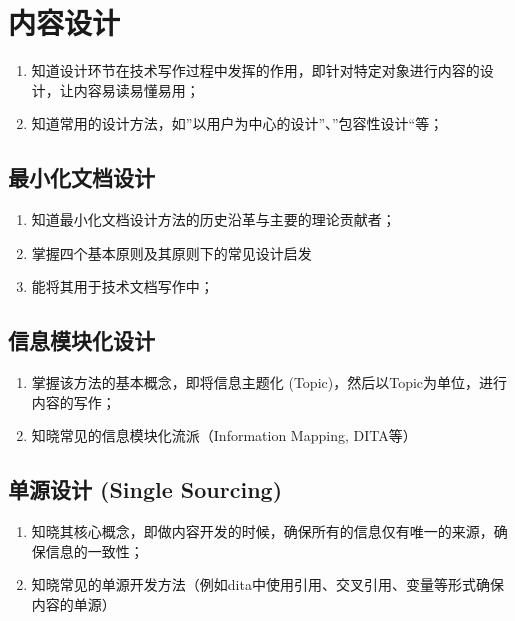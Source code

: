 \documentclass[letterpaper,10pt,english]{sphinxmanual}
\begin{document}
\section{内容设计}
\label{\detokenize{about/tw-comp-model:id6}}\begin{enumerate}
%
\item {} 
\sphinxAtStartPar
知道设计环节在技术写作过程中发挥的作用，即针对特定对象进行内容的设计，让内容易读易懂易用；

\item {} 
\sphinxAtStartPar
知道常用的设计方法，如”以用户为中心的设计”、”包容性设计“等；

\end{enumerate}


\subsection{最小化文档设计}
\label{\detokenize{about/tw-comp-model:id7}}\begin{enumerate}
%
\item {} 
\sphinxAtStartPar
知道最小化文档设计方法的历史沿革与主要的理论贡献者；

\item {} 
\sphinxAtStartPar
掌握四个基本原则及其原则下的常见设计启发

\item {} 
\sphinxAtStartPar
能将其用于技术文档写作中；

\end{enumerate}


\subsection{信息模块化设计}
\label{\detokenize{about/tw-comp-model:id8}}\begin{enumerate}
%
\item {} 
\sphinxAtStartPar
掌握该方法的基本概念，即将信息主题化 (Topic)，然后以Topic为单位，进行内容的写作；

\item {} 
\sphinxAtStartPar
知晓常见的信息模块化流派（Information Mapping, DITA等）

\end{enumerate}


\subsection{单源设计 (Single Sourcing)}
\label{\detokenize{about/tw-comp-model:single-sourcing}}\begin{enumerate}
%
\item {} 
\sphinxAtStartPar
知晓其核心概念，即做内容开发的时候，确保所有的信息仅有唯一的来源，确保信息的一致性；

\item {} 
\sphinxAtStartPar
知晓常见的单源开发方法（例如dita中使用引用、交叉引用、变量等形式确保内容的单源）

\end{enumerate}
\end{document}
